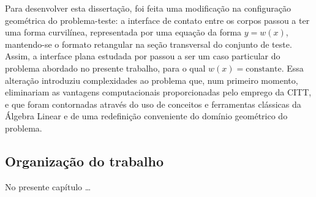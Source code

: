 Para desenvolver esta dissertação, foi feita uma modificação na configuração geométrica do problema-teste: a interface de contato entre os corpos passou a
ter uma forma curvilínea, representada por uma equação da forma $y = w(x)$, mantendo-se o formato retangular na seção transversal do conjunto
de teste. Assim, a interface plana estudada por \cite{tese_padilha} passou a ser um caso particular do problema abordado no presente trabalho, para
o qual $w(x) = \text{constante}$. Essa alteração introduziu complexidades ao problema que, num primeiro momento, eliminariam as vantagens computacionais
proporcionadas pelo emprego da CITT, e que foram contornadas através do uso de conceitos e ferramentas clássicas da Álgebra Linear e de uma redefinição conveniente
do domínio geométrico do problema.

\subsection{Organização do trabalho}

No presente capítulo \ldots
